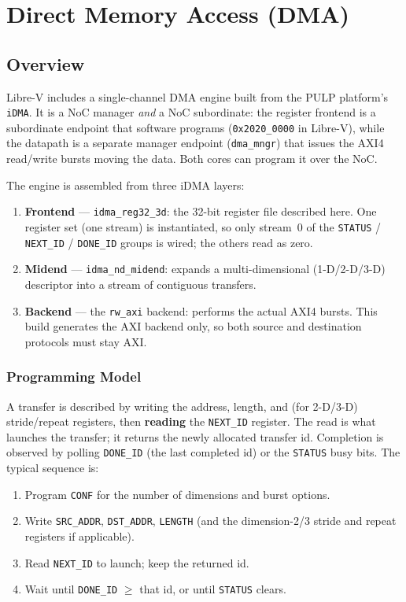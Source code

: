 \chapter{Direct Memory Access (DMA)}\label{ch:sw-dma}

\section{Overview}
Libre-V includes a single-channel DMA engine built from the PULP platform's \texttt{iDMA}. It is a NoC
manager \emph{and} a NoC subordinate: the register frontend is a subordinate endpoint that software
programs (\texttt{0x2020\_0000} in Libre-V), while the datapath is a separate manager endpoint
(\texttt{dma\_mngr}) that issues the AXI4 read/write bursts moving the data. Both cores can program it
over the NoC.

The engine is assembled from three iDMA layers:
\begin{enumerate}[nosep]
  \item \textbf{Frontend} --- \texttt{idma\_reg32\_3d}: the 32-bit register file described here. One
        register set (one stream) is instantiated, so only stream~0 of the \texttt{STATUS} /
        \texttt{NEXT\_ID} / \texttt{DONE\_ID} groups is wired; the others read as zero.
  \item \textbf{Midend} --- \texttt{idma\_nd\_midend}: expands a multi-dimensional (1-D/2-D/3-D)
        descriptor into a stream of contiguous transfers.
  \item \textbf{Backend} --- the \texttt{rw\_axi} backend: performs the actual AXI4 bursts. This build
        generates the AXI backend only, so both source and destination protocols must stay AXI.
\end{enumerate}

\subsection{Programming Model}
A transfer is described by writing the address, length, and (for 2-D/3-D) stride/repeat registers, then
\textbf{reading} the \texttt{NEXT\_ID} register. The read is what launches the transfer; it returns the
newly allocated transfer id. Completion is observed by polling \texttt{DONE\_ID} (the last completed id)
or the \texttt{STATUS} busy bits. The typical sequence is:
\begin{enumerate}[nosep]
  \item Program \texttt{CONF} for the number of dimensions and burst options.
  \item Write \texttt{SRC\_ADDR}, \texttt{DST\_ADDR}, \texttt{LENGTH} (and the dimension-2/3 stride and
        repeat registers if applicable).
  \item Read \texttt{NEXT\_ID} to launch; keep the returned id.
  \item Wait until \texttt{DONE\_ID} $\ge$ that id, or until \texttt{STATUS} clears.
\end{enumerate}

